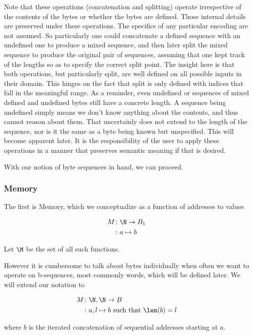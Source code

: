 \documentclass[11pt]{article}
\begin{document}
Note that these operations (concatenation and splitting) operate
irrespective of the contents of the bytes or whether the bytes are
defined. Those internal details are preserved under these
operations. The specifics of any particular encoding are not
assumed. So particularly one could concatenate a defined sequence with
an undefined one to produce a mixed sequence, and then later split the
mixed sequence to produce the original pair of sequences, assuming
that one kept track of the lengths so as to specify the correct split
point. The insight here is that both operations, but particularly
split, are well defined on all possible inputs in their domain. This
hinges on the fact that split is only defined with indices that fall
in the meaningful range. As a reminder, even undefined or sequences of
mixed defined and undefined bytes still have a concrete length. A
sequence being undefined simply means we don't know anything about the
contents, and thus cannot reason about them. That uncertainly does not
extend to the length of the sequence, nor is it the same as a byte
being known but unspecified. This will become apparent later. It is
the responsibility of the user to apply these operations in a manner
that preserves semantic meaning if that is desired.

With our notion of byte sequences in hand, we can proceed.

\subsubsection{Memory}
\label{sec:org8ad202d}
The first is Memory, which we conceptualize as a function of addresses
to values

\begin{align*}
M\colon& \N \to B_1\\
\colon& a \mapsto b
\end{align*}

Let \(\M\) be the set of all such functions.

However it is cumbersome to talk about bytes individually when often
we want to operate on b-sequences, most commonly words, which will be
defined later. We will extend our notation to

\begin{align*}
M\colon& \N,\N \to B\\
\colon& a, l \mapsto b \mbox{ such that } \len(b) = l
\end{align*}

where \(b\) is the iterated concatenation of sequential addresses
starting at \(a\).
\end{document}
